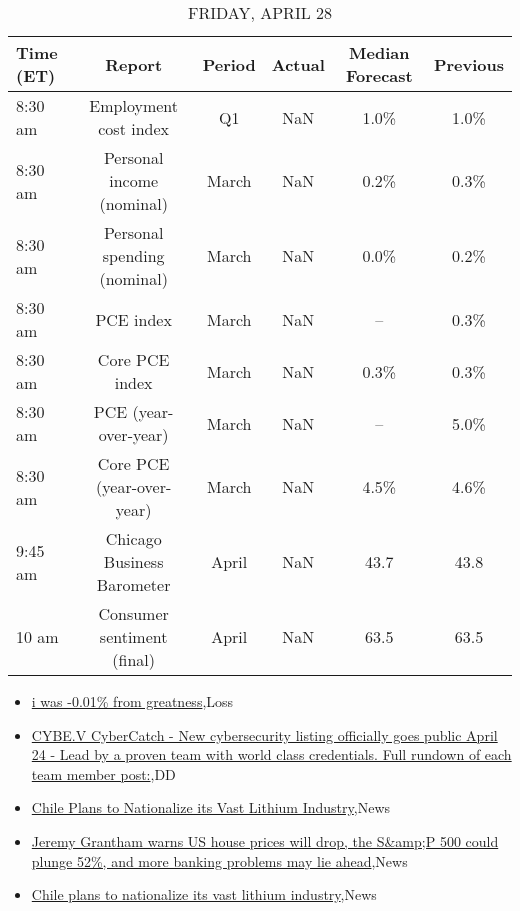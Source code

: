 \documentclass{article}%
\begin{document}
\begin{table}[htbp]%
\caption{FRIDAY, APRIL 28}%
\centering%
\begin{adjustbox}{width=1\textwidth}%
\begin{tabular}{lccccc}
\toprule
Time (ET) &                      Report & Period & Actual & Median Forecast & Previous \\
\midrule
  8:30 am &       Employment cost index &     Q1 &    NaN &            1.0\% &     1.0\% \\
  8:30 am &   Personal income (nominal) &  March &    NaN &            0.2\% &     0.3\% \\
  8:30 am & Personal spending (nominal) &  March &    NaN &            0.0\% &     0.2\% \\
  8:30 am &                   PCE index &  March &    NaN &              -- &     0.3\% \\
  8:30 am &              Core PCE index &  March &    NaN &            0.3\% &     0.3\% \\
  8:30 am &        PCE (year-over-year) &  March &    NaN &              -- &     5.0\% \\
  8:30 am &   Core PCE (year-over-year) &  March &    NaN &            4.5\% &     4.6\% \\
  9:45 am &  Chicago Business Barometer &  April &    NaN &            43.7 &     43.8 \\
    10 am &  Consumer sentiment (final) &  April &    NaN &            63.5 &     63.5 \\
\bottomrule
\end{tabular}
%
\end{adjustbox}%
\end{table}

%
\begin{itemize}%
\item%
\href{https://reddit.com/r/wallstreetbets/comments/12v04h5/i\_was\_001\_from\_greatness/}{i was -0.01\% from greatness},Loss%
\item%
\href{https://reddit.com/r/Baystreetbets/comments/12u5q1x/cybev\_cybercatch\_new\_cybersecurity\_listing/}{CYBE.V CyberCatch - New cybersecurity listing officially goes public April 24 - Lead by a proven team with world class credentials. Full rundown of each team member post:},DD%
\item%
\href{https://reddit.com/r/StockMarket/comments/12v1hmu/chile\_plans\_to\_nationalize\_its\_vast\_lithium/}{Chile Plans to Nationalize its Vast Lithium Industry},News%
\item%
\href{https://reddit.com/r/Economics/comments/12v18ig/jeremy\_grantham\_warns\_us\_house\_prices\_will\_drop/}{Jeremy Grantham warns US house prices will drop, the S\&amp;P 500 could plunge 52\%, and more banking problems may lie ahead},News%
\item%
\href{https://reddit.com/r/Economics/comments/12ugsgd/chile\_plans\_to\_nationalize\_its\_vast\_lithium/}{Chile plans to nationalize its vast lithium industry},News%
\end{itemize}%
\end{document}
